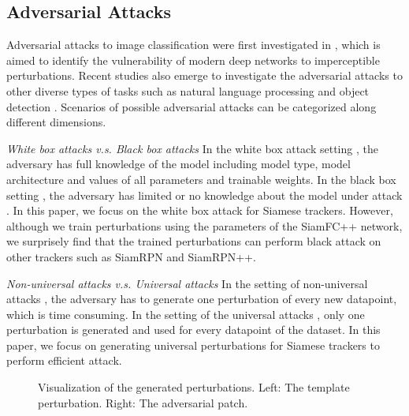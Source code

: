 \documentclass[journal]{IEEEtran}
\begin{document}
\subsection{Adversarial Attacks}

Adversarial attacks to image classification were first investigated in \cite{intriguing}, which is aimed to identify the vulnerability of modern deep networks to imperceptible perturbations. 
Recent studies also emerge to investigate the adversarial attacks to other diverse types of tasks such as natural language processing \cite{generating,zhang2020adversarial,morris2020textattack,jin2020bert} and object detection \cite{wei2019transferable}.
Scenarios of possible adversarial attacks can be categorized along different dimensions.

\textit{White box attacks v.s. Black box attacks} In the white box attack setting \cite{meng2019white}, the adversary has full knowledge of the model including model type, model architecture and values of all parameters and trainable weights. In the black box setting \cite{cheng2018query,li2019nattack,papernot2017practical,li2020projection}, the adversary has limited or no knowledge about the model under attack \cite{kurakin2018adversarial}. In this paper, we focus on the white box attack for Siamese trackers. However, although we train perturbations using the parameters of the SiamFC++ network, we surprisely find that the trained perturbations can perform black attack on other trackers such as SiamRPN and SiamRPN++.

\textit{Non-universal attacks v.s. Universal attacks} In the setting of non-universal attacks \cite{dai2018adversarial,li2018second,lin2017tactics}, the adversary has to generate one perturbation of every new datapoint, which is time consuming. In the setting of the universal attacks \cite{khrulkov2018art,mopuri2018nag,zhang2020understanding,mopuri2018generalizable,chen2018shapeshifter}, only one perturbation is generated and used for every datapoint of the dataset. In this paper, we focus on generating universal perturbations for Siamese trackers to perform efficient attack.

\begin{figure}[t]
  \centering
   \qquad
  \caption{Visualization of the generated perturbations. Left: The template perturbation. Right: The adversarial patch.}
  \label{fig:vis_perturbations}
\end{figure}
\end{document}
